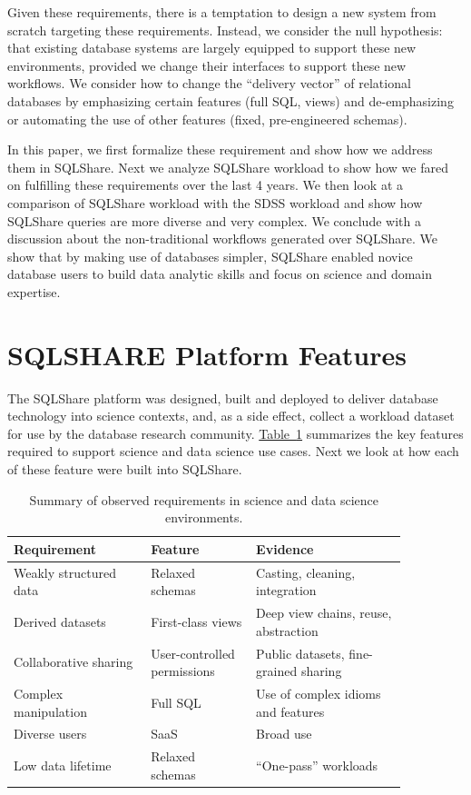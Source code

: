 \documentclass{sig-alternate}
\newcommand{\tabref}[1]{\hyperref[#1]{Table~\ref*{#1}}}
\newcommand{\sqlshare}{SQLShare}
\newcommand{\SQLSHARE}{SQLSHARE}
\begin{document}
Given these requirements, there is a temptation to design a new system from scratch targeting these requirements. Instead, we consider the null hypothesis: that existing database systems are largely equipped to support these new environments, provided we change their interfaces to support these new workflows.  We consider how to change the ``delivery vector'' of relational databases by emphasizing certain features (full SQL, views) and de-emphasizing or automating the use of other features (fixed, pre-engineered schemas).

In this paper, we first formalize these requirement and show how we address them in \sqlshare{}. Next we analyze \sqlshare{} workload to show how we fared on fulfilling these requirements over the last 4 years. 
We then look at a comparison of \sqlshare{} workload with the SDSS workload and show how \sqlshare{} queries are more diverse and very complex. 
We conclude with a discussion about the non-traditional workflows generated over \sqlshare{}. We show that by making use of databases simpler, \sqlshare{} enabled novice database users to build data analytic skills and focus on science and domain expertise.

\section{\SQLSHARE{} Platform Features}
\label{sec:sqlshare}

The \sqlshare{} \cite{howe2011database} platform was designed, built and deployed to deliver database technology into science contexts, and, as a side effect, collect a workload dataset for use by the database research community. 
\tabref{t:notation} summarizes the key features required to support science and data science use cases. Next we look at how each of these feature were built into \sqlshare.

\begin{table}
\begin{small}
\caption{Summary of observed requirements in science and data science environments.}
\label{t:notation}
\centering
\begin{tabular}{|p{0.3\linewidth}|p{0.23\linewidth}|p{0.33\linewidth}|}\hline
Requirement & Feature & Evidence \\
\hline
Weakly structured data & Relaxed schemas & Casting, cleaning, integration \\ \hline
Derived datasets & First-class views & Deep view chains, reuse, abstraction \\ \hline
Collaborative sharing & User-controlled permissions & Public datasets, fine-grained sharing \\ \hline
Complex manipulation & Full SQL & Use of complex idioms and features \\ \hline
Diverse users & SaaS & Broad use \\ \hline
Low data lifetime & Relaxed schemas & ``One-pass'' workloads\\ \hline
\end{tabular}
\end{small}
\end{table}
\end{document}
